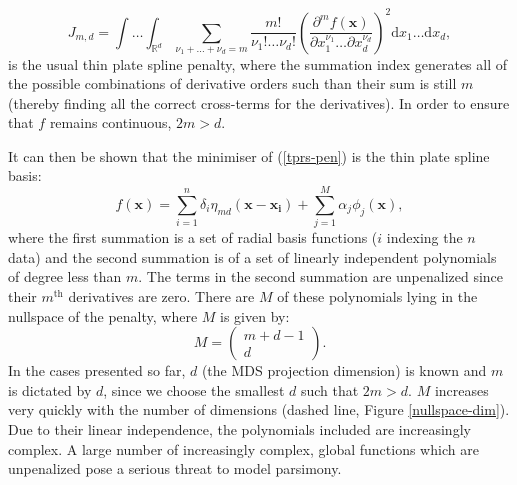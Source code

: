 \documentclass[useAMS, referee]{biom}
\begin{document}
\begin{equation}
J_{m,d} = \int \ldots \int_{\mathbb{R}^d} \sum_{\nu_1 + \dots + \nu_d=m} \frac{m!}{\nu_1! \dots \nu_d!} \left( \frac{\partial^m f \left (\mathbf{x} \right )}{\partial x_1^{\nu_1} \ldots  \partial x_d^{\nu_d}} \right)^2 \text{d} x_1 \ldots  \text{d} x_d,
\label{tprs-pen}
\end{equation}
is the usual thin plate spline penalty, where the summation index generates all of the possible combinations of derivative orders such than their sum is still $m$ (thereby finding all the correct cross-terms for the derivatives). In order to ensure that $f$ remains continuous, $2m>d$.

It can then be shown that the minimiser of (\ref{tprs-pen}) is the thin plate spline basis:
\begin{equation}
f(\mathbf{x}) = \sum_{i=1}^n \delta_i \eta_{md}(\mathbf{x}-\mathbf{x_i}) + \sum_{j=1}^M \alpha_j \phi_j(\mathbf{x}),
\label{tprs-basis}
\end{equation}
where the first summation is a set of radial basis functions ($i$ indexing the $n$ data) and the second summation is of a set of linearly independent polynomials of degree less than $m$. The terms in the second summation are unpenalized since their $m^\text{th}$ derivatives are zero. There are $M$ of these polynomials lying in the nullspace of the penalty, where $M$ is given by:
\begin{equation}
M=\begin{pmatrix} m+d-1 \\ d  \end{pmatrix}.
\label{gds-bigm}
\end{equation}
In the cases presented so far, $d$ (the MDS projection dimension) is known and $m$ is dictated by $d$, since we choose the smallest $d$ such that $2m>d$. $M$ increases very quickly with the number of dimensions (dashed line, Figure \ref{nullspace-dim}). Due to their linear independence, the polynomials included are increasingly complex. A large number of increasingly complex, global functions which are unpenalized pose a serious threat to model parsimony.
\end{document}

